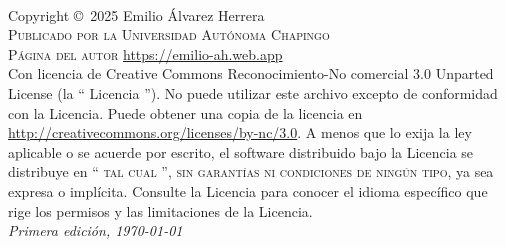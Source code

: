 \documentclass[11pt,fleqn]{book}
\begin{document}

\newpage
~\vfill
\thispagestyle{empty}

\noindent Copyright \copyright\ 2025 Emilio Álvarez Herrera\\ %

\noindent \textsc{Publicado por la Universidad Autónoma Chapingo}\\ %

\noindent \textsc{Página del autor} \url{https://emilio-ah.web.app}\\ 

\noindent Con licencia de Creative Commons Reconocimiento-No comercial 3.0 Unparted License (la `` Licencia ''). No puede utilizar este archivo excepto de conformidad con la Licencia. Puede obtener una copia de la licencia en \url {http://creativecommons.org/licenses/by-nc/3.0}. A menos que lo exija la ley aplicable o se acuerde por escrito, el software distribuido bajo la Licencia se distribuye en \textsc{`` tal cual '', sin garantías ni condiciones de ningún tipo}, ya sea expresa o implícita. Consulte la Licencia para conocer el idioma específico que rige los permisos y las limitaciones de la Licencia.\\ %

\noindent \textit{Primera edición, \today} %





\pagestyle{empty} %

\tableofcontents %

\cleardoublepage %
\end{document}
